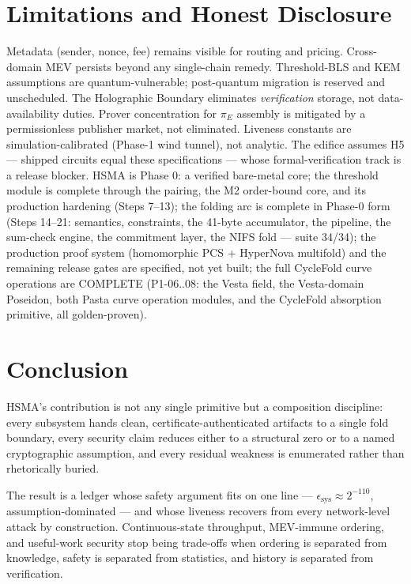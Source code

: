 \documentclass[11pt, a4paper]{article}
\begin{document}
\section{Limitations and Honest Disclosure}
Metadata (sender, nonce, fee) remains visible for routing and pricing. Cross-domain MEV persists beyond any single-chain remedy. Threshold-BLS and KEM assumptions are quantum-vulnerable; post-quantum migration is reserved and unscheduled. The Holographic Boundary eliminates \emph{verification} storage, not data-availability duties. Prover concentration for $\pi_E$ assembly is mitigated by a permissionless publisher market, not eliminated. Liveness constants are simulation-calibrated (Phase-1 wind tunnel), not analytic. The edifice assumes H5 --- shipped circuits equal these specifications --- whose formal-verification track is a release blocker. HSMA is Phase 0: a verified bare-metal core; the threshold module is complete through the pairing, the M2 order-bound core, and its production hardening (Steps 7--13); the folding arc is complete in Phase-0 form (Steps 14--21: semantics, constraints, the 41-byte accumulator, the pipeline, the sum-check engine, the commitment layer, the NIFS fold --- suite 34/34); the production proof system (homomorphic PCS + HyperNova multifold) and the remaining release gates are specified, not yet built; the full CycleFold curve operations are COMPLETE (P1-06..08: the Vesta field, the Vesta-domain Poseidon, both Pasta curve operation modules, and the CycleFold absorption primitive, all golden-proven).

\section{Conclusion}

HSMA's contribution is not any single primitive but a composition discipline: every subsystem hands clean, certificate-authenticated artifacts to a single fold boundary, every security claim reduces either to a structural zero or to a named cryptographic assumption, and every residual weakness is enumerated rather than rhetorically buried.

The result is a ledger whose safety argument fits on one line --- $\epsilon_{\text{sys}} \approx 2^{-110}$, assumption-dominated --- and whose liveness recovers from every network-level attack by construction. Continuous-state throughput, MEV-immune ordering, and useful-work security stop being trade-offs when ordering is separated from knowledge, safety is separated from statistics, and history is separated from verification.
\end{document}
